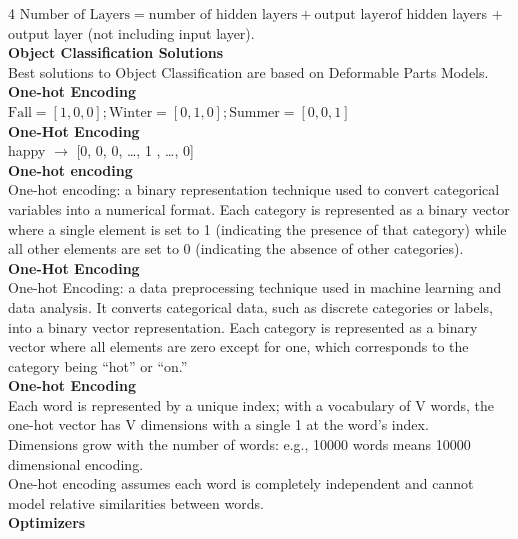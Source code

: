 \documentclass[8pt]{extarticle}
\begin{document}
\begin{multicols}{4}
$\text{Number of Layers} = \text{number of hidden layers} + \text{output layer}$\Number of hidden layers + output layer (not including input layer).\\
\vspace{2pt}\textbf{Object Classification Solutions}\\
Best solutions to Object Classification are based on Deformable Parts Models.\\
\vspace{2pt}\textbf{One-hot Encoding}\\
$\text{Fall} = [1, 0, 0]; \text{Winter} = [0, 1, 0]; \text{Summer} = [0, 0, 1]$\\
\vspace{2pt}\textbf{One-Hot Encoding}\\
happy $\rightarrow$ [0, 0, 0, \ldots{}, 1 , \ldots{}, 0]\\
\vspace{2pt}\textbf{One-hot encoding}\\
One-hot encoding: a binary representation technique used to convert categorical variables into a numerical format. Each category is represented as a binary vector where a single element is set to 1 (indicating the presence of that category) while all other elements are set to 0 (indicating the absence of other categories).\\
\vspace{2pt}\textbf{One-Hot Encoding}\\
One-hot Encoding: a data preprocessing technique used in machine learning and data analysis. It converts categorical data, such as discrete categories or labels, into a binary vector representation. Each category is represented as a binary vector where all elements are zero except for one, which corresponds to the category being ``hot'' or ``on.''\\
\vspace{2pt}\textbf{One-hot Encoding}\\
Each word is represented by a unique index; with a vocabulary of V words, the one-hot vector has V dimensions with a single 1 at the word's index.\\
Dimensions grow with the number of words: e.g., 10000 words means 10000 dimensional encoding.\\
One-hot encoding assumes each word is completely independent and cannot model relative similarities between words.\\
\vspace{2pt}\textbf{Optimizers}\\

\end{multicols}
\end{document}
